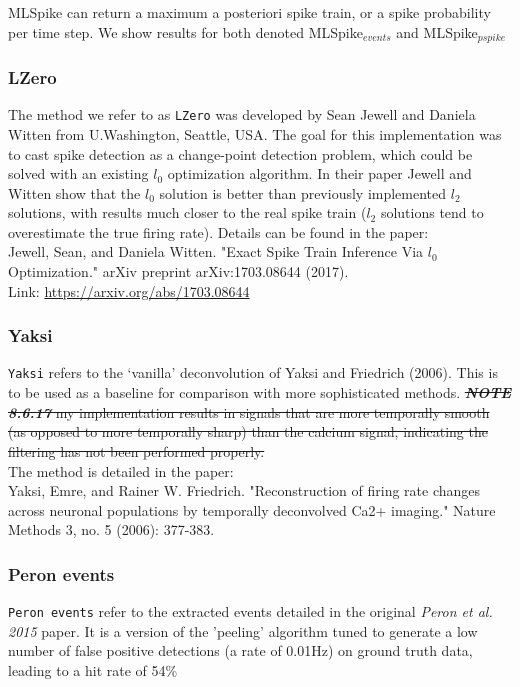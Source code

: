 \documentclass[a4paper,10pt,twocolumn]{article}
\begin{document}
MLSpike can return a maximum a posteriori spike train, or a spike probability per time step. We show results for both denoted MLSpike$_{events}$ and MLSpike$_{pspike}$

\subsubsection*{LZero}
The method we refer to as \texttt{LZero} was developed by Sean Jewell and Daniela Witten from U.Washington, Seattle, USA. The goal for this implementation was to cast spike detection as a change-point detection problem, which could be solved with an existing $l_{0}$ optimization algorithm. In their paper Jewell and Witten show that the $l_{0}$ solution is better than previously implemented $l_{2}$ solutions, with results much closer to the real spike train ($l_{2}$ solutions tend to overestimate the true firing rate). Details can be found in the paper:\\

\noindent Jewell, Sean, and Daniela Witten. "Exact Spike Train Inference Via $l_{0}$ Optimization." arXiv preprint arXiv:1703.08644 (2017).\\

\noindent Link: \href{https://arxiv.org/abs/1703.08644}{https://arxiv.org/abs/1703.08644}

\subsubsection*{Yaksi}
\texttt{Yaksi} refers to the `vanilla' deconvolution of Yaksi and Friedrich (2006). This is to be used as a baseline for comparison with more sophisticated methods. \st{\textbf{\emph{NOTE 8.6.17}} my implementation results in signals that are more temporally smooth (as opposed to more temporally sharp) than the calcium signal, indicating the filtering has not been performed properly.} \\

\noindent The method is detailed in the paper: \\
\noindent Yaksi, Emre, and Rainer W. Friedrich. "Reconstruction of firing rate changes across neuronal populations by temporally deconvolved Ca2+ imaging." Nature Methods 3, no. 5 (2006): 377-383.


\subsubsection*{Peron events}
\texttt{Peron events} refer to the extracted events detailed in the original \emph{Peron et al. 2015} paper. It is a version of the 'peeling' algorithm tuned to generate a low number of false positive detections (a rate of 0.01Hz) on ground truth data, leading to a hit rate of 54$\%$
\end{document}
